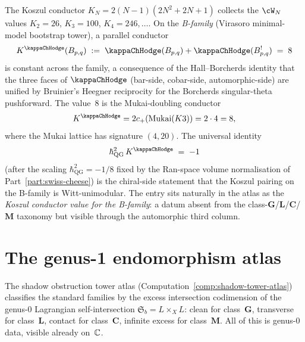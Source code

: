 \begin{remark}[$K^{\kappaChHodge} = 8$ on the B-family]
\label{rem:rosetta-Kkappa-eight}
%
%
The Koszul conductor $K_N = 2(N-1)(2N^2+2N+1)$ collects the
$\cW_N$ values $K_2 = 26$, $K_3 = 100$, $K_4 = 246,\ldots$\@. On the
\emph{B-family} (Virasoro minimal-model bootstrap tower), a
parallel conductor
\[
K^{\kappaChHodge}(B_{p,q})
\;:=\;
\kappaChHodge(B_{p,q}) + \kappaChHodge(B_{p,q}^!)
\;=\;
8
\]
is constant across the family, a consequence of the Hall--Borcherds
identity that the three faces of $\kappaChHodge$ (bar-side,
cobar-side, automorphic-side) are unified by Bruinier's Heegner
reciprocity for the Borcherds singular-theta pushforward. The
value~$8$ is the Mukai-doubling conductor
\[
K^{\kappaChHodge}
=2c_+(\mathrm{Mukai}(K3))
=2\cdot4
=8,
\]
where the Mukai lattice has signature $(4,20)$. The
universal identity
\[
\hbar_{\mathrm{QG}}^{2}\,K^{\kappaChHodge} \;=\; -1
\]
\textup{(}after the scaling $\hbar_{\mathrm{QG}}^2 = -1/8$ fixed by the
Ran-space volume normalisation of Part~\ref{part:swiss-cheese}\textup{)}
is the chiral-side statement that the Koszul pairing on the
B-family is Witt-unimodular. The entry sits naturally in the atlas
as the \emph{Koszul conductor value for the B-family}: a datum
absent from the class-$\mathbf{G}$/$\mathbf{L}$/$\mathbf{C}$/$\mathbf{M}$
taxonomy but visible through the automorphic third column.
\end{remark}

\section{The genus-1 endomorphism atlas}%
\label{sec:genus1-endomorphism-atlas}%
%
%

\providecommand{\Mvac}{\cM_{\mathrm{vac}}}
\providecommand{\Mbar}{\overline{\mathcal{M}}}
\providecommand{\HH}{\operatorname{HH}}
\providecommand{\End}{\operatorname{End}}

The shadow obstruction tower atlas
(Computation~\ref{comp:shadow-tower-atlas}) classifies the
standard families by the excess intersection codimension of
the genus-$0$ Lagrangian self-intersection
$\mathfrak{S}_b = L \times_X L$: clean for class~$\mathbf{G}$,
transverse for class~$\mathbf{L}$, contact for
class~$\mathbf{C}$, infinite excess for class~$\mathbf{M}$.
All of this is genus-$0$ data, visible already on~$\mathbb{C}$.

